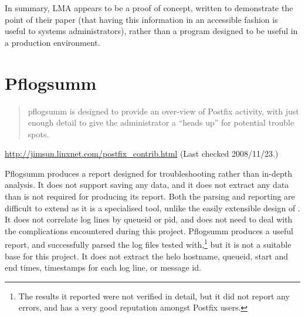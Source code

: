 In summary, \gls{LMA} appears to be a proof of concept, written to
demonstrate the point of their paper (that having this information in an
accessible fashion is useful to systems administrators), rather than a
program designed to be useful in a production environment.

%

\section{Pflogsumm}

\begin{quotation}

    pflogsumm is designed to provide an over-view of Postfix activity, with
    just enough detail to give the administrator a ``heads up'' for
    potential trouble spots.

\end{quotation}

\noindent{}\url{http://jimsun.linxnet.com/postfix_contrib.html} \newline{}
(Last checked 2008/11/23.)

Pflogsumm produces a report designed for troubleshooting rather than
in-depth analysis.  It does not support saving any data, and it does not
extract any data than is not required for producing its report.  Both the
parsing and reporting are difficult to extend as it is a specialised tool,
unlike the easily extensible design of \parsername{}.  It does not
correlate log lines by queueid or \gls{pid}, and does not need to deal with
the complications encountered during this project.  Pflogsumm produces a
useful report, and successfully parsed the \numberOFlogFILES{} log files
tested with,\footnote{The results it reported were not verified in detail,
but it did not report any errors, and has a very good reputation amongst
Postfix users.} but it is not a suitable base for this project.  It does
not extract the helo hostname, queueid, start and end times, timestamps for
each log line, or message id.

